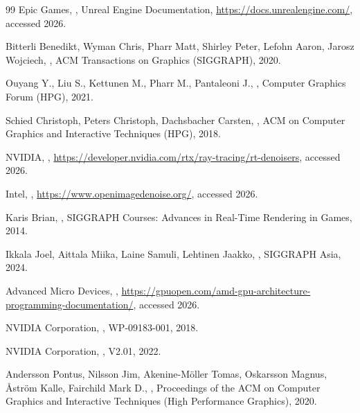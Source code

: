 \begin{thebibliography}{99}
Epic Games, , Unreal Engine Documentation,
\url{https://docs.unrealengine.com/}, accessed 2026.

Bitterli Benedikt, Wyman Chris, Pharr Matt, Shirley Peter, Lefohn Aaron, Jarosz Wojciech,
, ACM
Transactions on Graphics (SIGGRAPH), 2020.

Ouyang Y., Liu S., Kettunen M., Pharr M., Pantaleoni J., , Computer Graphics Forum (HPG), 2021.

Schied Christoph, Peters Christoph, Dachsbacher Carsten, , ACM on Computer Graphics and Interactive Techniques (HPG), 2018.

NVIDIA, ,
\url{https://developer.nvidia.com/rtx/ray-tracing/rt-denoisers}, accessed 2026.

Intel, , \url{https://www.openimagedenoise.org/}, accessed 2026.

Karis Brian, , SIGGRAPH Courses: Advances in Real-Time
Rendering in Games, 2014.

Ikkala Joel, Aittala Miika, Laine Samuli, Lehtinen Jaakko, , SIGGRAPH Asia, 2024.

Advanced Micro Devices, ,
\url{https://gpuopen.com/amd-gpu-architecture-programming-documentation/}, accessed 2026.

NVIDIA Corporation, , WP-09183-001, 2018.

NVIDIA Corporation, , V2.01, 2022.

Andersson Pontus, Nilsson Jim, Akenine-M\"oller Tomas, Oskarsson Magnus, \r{A}str\"om Kalle, Fairchild
Mark D., , Proceedings of the ACM on Computer
Graphics and Interactive Techniques (High Performance Graphics), 2020.


\end{thebibliography}
